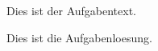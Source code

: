 \documentclass{atistandalonetask}
\begin{document}
  \begin{atiTask}[
    title = Aufgabentitel
  ]
    Dies ist der Aufgabentext.
    
  \end{atiTask}
  \begin{atiSolution}
    Dies ist die Aufgabenloesung.
  \end{atiSolution}
\end{document}
